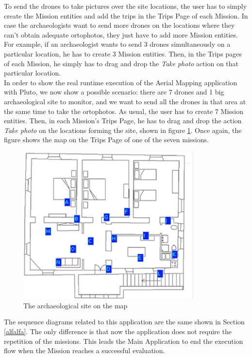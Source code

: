 To send the drones to take pictures over the site locations, the user has to simply create the Mission entities and add the trips in the Trips Page of each Mission.
In case the archaeologists want to send more drones on the locations where they can't obtain adequate ortophotos, they just have to add more Mission entities.
For example, if an archaeologist wants to send 3 drones simultaneously on a particular location, he has to create 3 Mission entities.
Then, in the Trips pages of each Mission, he simply has to drag and drop the \textit{Take photo} action on that particular location.
\\

In order to show the real runtime execution of the Aerial Mapping application with Pluto, we now show a possible scenario:
there are 7 drones and 1 big archaeological site to monitor, and we want to send all the drones in that area at the same time to take the ortophotos.
As usual, the user has to create 7 Mission entities.
Then, in each Mission's Trips Page, he has to drag and drop the action \textit{Take photo} on the locations forming the site, shown in figure \ref{fig:puttiArea}.
Once again, the figure shows the map on the Trips Page of one of the seven missions.

\begin{figure}[h!]
\centering
\includegraphics[width=\linewidth, height=8cm]{pictures/puttiArea.png}
\caption{The archaeological site on the map}
\label{fig:puttiArea}
\end{figure}

The sequence diagrams related to this application are the same shown in Section \ref{alfalfa}. 
The only difference is that now the application does not require the repetition of the missions.
This leads the Main Application to end the execution flow when the Mission reaches a successful evaluation.

